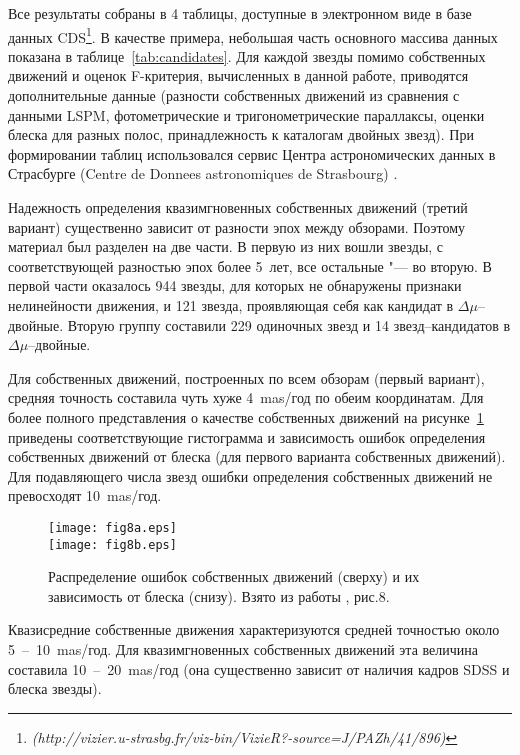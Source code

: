 Все результаты собраны в 4 таблицы, доступные в электронном виде в базе данных CDS\footnote{\textit{(http://vizier.u-strasbg.fr/viz-bin/VizieR?-source=J/PAZh/41/896)}}. В качестве примера, небольшая часть основного массива данных показана в таблице~\ref{tab:candidates}. Для каждой звезды помимо собственных движений и оценок F-критерия, вычисленных в данной работе, приводятся дополнительные данные (разности собственных движений из сравнения с данными LSPM, фотометрические и тригонометрические параллаксы, оценки блеска для разных полос, принадлежность к каталогам двойных звезд). При формировании таблиц использовался сервис Центра астрономических данных в Страсбурге (Centre de Donnees astronomiques de Strasbourg) \cite{2000A&AS..143...23O}.

Надежность определения квазимгновенных собственных движений (третий вариант) существенно зависит от разности эпох между обзорами. Поэтому материал был разделен на две части. В первую из них вошли звезды, с соответствующей разностью эпох более 5~лет, все остальные "--- во вторую. В первой части оказалось 944 звезды, для которых не обнаружены признаки нелинейности движения, и 121 звезда, проявляющая себя как кандидат в $\Delta\mu$--двойные. Вторую группу составили 229 одиночных звезд  и 14 звезд--кандидатов в $\Delta\mu$--двойные.

Для собственных движений, построенных по всем обзорам (первый вариант), средняя точность составила чуть хуже 4~mas/год по обеим координатам. Для более полного представления о качестве собственных движений на рисунке~\ref{fig:15emu} приведены соответствующие гистограмма и зависимость ошибок определения собственных движений от блеска (для первого варианта собственных движений). Для подавляющего числа звезд ошибки определения собственных движений не превосходят 10~mas/год.

\begin{figure}[h]
\centering
\texttt{[image: fig8a.eps]}\\
\texttt{[image: fig8b.eps]}
\caption{Распределение ошибок собственных движений (сверху) и их зависимость от блеска (снизу). Взято из работы \cite{2015AstL...41..833K}, рис.8.}
\label{fig:15emu}
\end{figure}

Квазисредние собственные движения характеризуются средней точностью около 5~--~10~mas/год. Для квазимгновенных собственных движений эта величина составила 10~--~20~mas/год (она существенно зависит от наличия кадров SDSS и блеска звезды).

